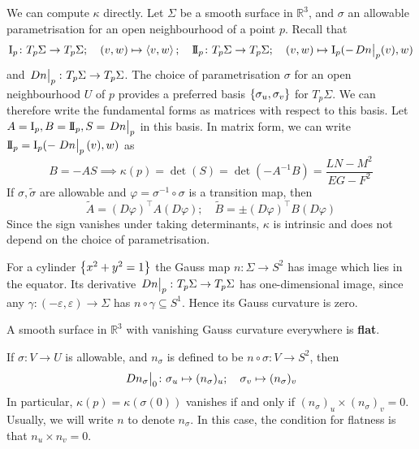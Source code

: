 \documentclass[a4paper,11pt]{article}
\begin{document}
We can compute \( \kappa \) directly.
Let \( \Sigma \) be a smooth surface in \( \mathbb R^3 \), and \( \sigma \) an allowable parametrisation for an open neighbourhood of a point \( p \).
Recall that
\[
	\Iff_p \colon T_p \Sigma \to T_p \Sigma;\quad (v,w) \mapsto \inner{v,w};\quad \IIff_p \colon T_p \Sigma \to T_p \Sigma;\quad (v,w) \mapsto \Iff_p(-\teval{Dn}p(v), w)
\]
and \( \eval{Dn}_p \colon T_p \Sigma \to T_p \Sigma \).
The choice of parametrisation \( \sigma \) for an open neighbourhood \( U \) of \( p \) provides a preferred basis \( \qty{\sigma_u, \sigma_v} \) for \( T_p \Sigma \).
We can therefore write the fundamental forms as matrices with respect to this basis.
Let \( A = \Iff_p, B = \IIff_p, S = \eval{Dn}_p \) in this basis.
In matrix form, we can write \( \IIff_p = \Iff_p(-\eval{Dn}_p(v),w) \) as
\[
	B = -AS \implies \kappa(p) = \det(S) = \det(-A^{-1}B) = \frac{LN-M^2}{EG-F^2}
\]
If \( \sigma, \widetilde \sigma \) are allowable and \( \varphi = \sigma^{-1} \circ \sigma \) is a transition map, then
\[
	\widetilde A = (D\varphi)^\top A (D \varphi);\quad \widetilde B = \pm (D\varphi)^\top B (D \varphi)
\]
Since the sign vanishes under taking determinants, \( \kappa \) is intrinsic and does not depend on the choice of parametrisation.

\begin{example}
	For a cylinder \( \qty{x^2 + y^2 = 1} \) the Gauss map \( n \colon \Sigma \to S^2 \) has image which lies in the equator.
	Its derivative \( \eval{Dn}_p \colon T_p \Sigma \to T_p \Sigma \) has one-dimensional image, since any \( \gamma \colon (-\varepsilon, \varepsilon) \to \Sigma \) has \( n \circ \gamma \subseteq S^1 \).
	Hence its Gauss curvature is zero.
\end{example}

\begin{definition}
	A smooth surface in \( \mathbb R^3 \) with vanishing Gauss curvature everywhere is \textbf{flat}.
\end{definition}

\begin{remark}
	If \( \sigma\colon V \to U \) is allowable, and \( n_\sigma \) is defined to be \( n \circ \sigma \colon V \to S^2 \), then
	\[
		\teval{Dn_\sigma}0 \colon \sigma_u \mapsto (n_\sigma)_u;\quad \sigma_v \mapsto (n_\sigma)_v
	\]
	In particular, \( \kappa(p) = \kappa(\sigma(0)) \) vanishes if and only if \( (n_\sigma)_u \times (n_\sigma)_v = 0 \).
	Usually, we will write \( n \) to denote \( n_\sigma \).
	In this case, the condition for flatness is that \( n_u \times n_v = 0 \).
\end{remark}
\end{document}

